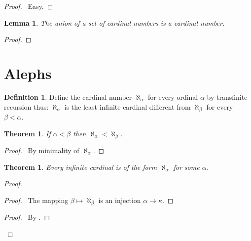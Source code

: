 \documentclass{report}
\let\qed\relax
\newtheorem{lemma}[axiom]{Lemma}
\newtheorem{theorem}[axiom]{Theorem}
\theoremstyle{definition}
\newtheorem{definition}[axiom]{Definition}
\begin{document}
    \begin{proof}
        \pf\ Easy. \qed
    \end{proof}

    \begin{lemma}
        The union of a set of cardinal numbers is a cardinal number.
    \end{lemma}

    \begin{proof}
        \pf
        \qed
    \end{proof}
    \section{Alephs}

    \begin{definition}
        Define the cardinal number $\aleph_\alpha$ for every ordinal $\alpha$ by transfinite recursion thus:
        $\aleph_\alpha$ is the least infinite cardinal different from $\aleph_\beta$ for every $\beta < \alpha$.
    \end{definition}

    \begin{theorem}
        If $\alpha < \beta$ then $\aleph_\alpha < \aleph_\beta$.
    \end{theorem}

    \begin{proof}
        \pf\ By minimality of $\aleph_\alpha$. \qed
    \end{proof}

    \begin{theorem}
        Every infinite cardinal is of the form $\aleph_\alpha$ for some $\alpha$.
    \end{theorem}

    \begin{proof}
        \pf
        \begin{proof}
            \pf\ The mapping $\beta \mapsto \aleph_\beta$ is an injection $\alpha \rightarrow \kappa$.
        \end{proof}
        \begin{proof}
            \pf\ By .
        \end{proof}
        \qed
    \end{proof}
\end{document}

